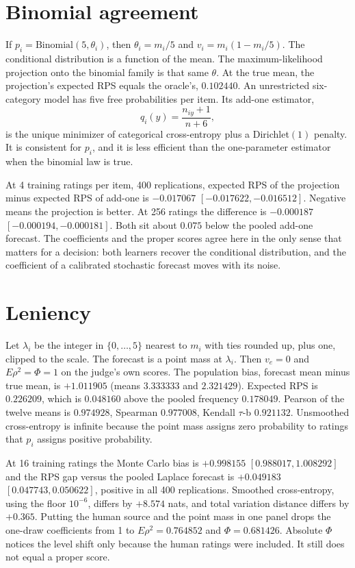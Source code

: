 \documentclass[11pt]{article}
\begin{document}
\section{Binomial agreement}

If $p_i=\mathrm{Binomial}(5,\theta_i)$, then $\theta_i=m_i/5$ and $v_i=m_i(1-m_i/5)$. The conditional distribution is a function of the mean. The maximum-likelihood projection onto the binomial family is that same $\theta$. At the true mean, the projection's expected RPS equals the oracle's, $0.102440$. An unrestricted six-category model has five free probabilities per item. Its add-one estimator,
\begin{equation}
q_i(y)=\frac{n_{iy}+1}{n+6},
\end{equation}
is the unique minimizer of categorical cross-entropy plus a Dirichlet$(1)$ penalty. It is consistent for $p_i$, and it is less efficient than the one-parameter estimator when the binomial law is true.

At 4 training ratings per item, 400 replications, expected RPS of the projection minus expected RPS of add-one is $-0.017067$ $[-0.017622,-0.016512]$. Negative means the projection is better. At 256 ratings the difference is $-0.000187$ $[-0.000194,-0.000181]$. Both sit about $0.075$ below the pooled add-one forecast. The coefficients and the proper scores agree here in the only sense that matters for a decision: both learners recover the conditional distribution, and the coefficient of a calibrated stochastic forecast moves with its noise.

\section{Leniency}

Let $\lambda_i$ be the integer in $\{0,\ldots,5\}$ nearest to $m_i$ with ties rounded up, plus one, clipped to the scale. The forecast is a point mass at $\lambda_i$. Then $v_e=0$ and $E\rho^2=\Phi=1$ on the judge's own scores. The population bias, forecast mean minus true mean, is $+1.011905$ (means $3.333333$ and $2.321429$). Expected RPS is $0.226209$, which is $0.048160$ above the pooled frequency $0.178049$. Pearson of the twelve means is $0.974928$, Spearman $0.977008$, Kendall $\tau$-b $0.921132$. Unsmoothed cross-entropy is infinite because the point mass assigns zero probability to ratings that $p_i$ assigns positive probability.

At 16 training ratings the Monte Carlo bias is $+0.998155$ $[0.988017,1.008292]$ and the RPS gap versus the pooled Laplace forecast is $+0.049183$ $[0.047743,0.050622]$, positive in all 400 replications. Smoothed cross-entropy, using the floor $10^{-6}$, differs by $+8.574$ nats, and total variation distance differs by $+0.365$. Putting the human source and the point mass in one panel drops the one-draw coefficients from 1 to $E\rho^2=0.764852$ and $\Phi=0.681426$. Absolute $\Phi$ notices the level shift only because the human ratings were included. It still does not equal a proper score.
\end{document}
